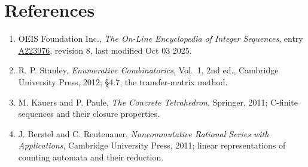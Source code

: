 \documentclass[11pt]{article}
\theoremstyle{definition}
\begin{document}
\section{References}

\begin{enumerate}

\item OEIS Foundation Inc., \emph{The On-Line Encyclopedia of Integer Sequences}, entry \href{https://oeis.org/A223976}{A223976}, revision 8, last modified Oct 03 2025.

\item R. P. Stanley, \emph{Enumerative Combinatorics}, Vol.~1, 2nd ed., Cambridge University Press, 2012; \S4.7, the transfer-matrix method.

\item M. Kauers and P. Paule, \emph{The Concrete Tetrahedron}, Springer, 2011; C-finite sequences and their closure properties.

\item J. Berstel and C. Reutenauer, \emph{Noncommutative Rational Series with Applications}, Cambridge University Press, 2011; linear representations of counting automata and their reduction.

\end{enumerate}
\end{document}
